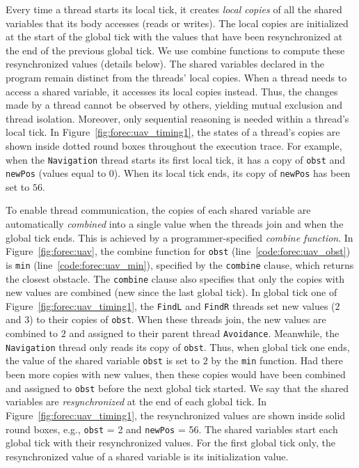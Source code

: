 Every time a thread starts its local tick, it creates
\emph{local copies} of all the shared variables that its
body accesses (reads or writes). 
The local copies are initialized at the start of the global tick with
the values that have been resynchronized at the end of the previous
global tick. We use combine functions to compute these resynchronized
values (details below). The shared variables
declared in the program remain distinct from the threads'
local copies. When a thread needs to access a shared
variable, it accesses its local copies instead. Thus, the
changes made by a thread cannot be observed by others,
yielding mutual exclusion and thread isolation. Moreover,
only sequential reasoning is needed within a thread's local
tick. In Figure~\ref{fig:forec:uav_timing1}, the states of a
thread's copies are shown inside dotted round boxes
throughout the execution trace. For example, when the
\verb$Navigation$ thread starts its first local tick, it has
a copy of \verb$obst$ and \verb$newPos$ (values equal to
$0$). When its local tick ends, its copy of \verb$newPos$ 
has been set to $56$.

To enable thread communication, the copies of each shared
variable are automatically \emph{combined} into a single value when the
threads join and when the global tick ends. This is achieved
by a programmer-specified \emph{combine function}. In
Figure~\ref{fig:forec:uav}, the combine function for 
\verb$obst$ (line~\ref{code:forec:uav_obst}) is \verb$min$
(line~\ref{code:forec:uav_min}), specified by the
\verb$combine$ clause, which returns the closest obstacle.
The \verb$combine$ clause also specifies that only the
copies with new values are combined (new since the last global
tick). In global tick one of
Figure~\ref{fig:forec:uav_timing1}, the \verb$FindL$ and
\verb$FindR$ threads set new values ($2$ and $3$) to their
copies of \verb$obst$. When these threads join, the new
values are combined to $2$ and assigned to their parent
thread \verb$Avoidance$. Meanwhile, the \verb$Navigation$
thread only reads its copy of \verb$obst$. Thus, when global
tick one ends, the value of the shared variable \verb$obst$
is set to $2$ by the \texttt{min} function. 
Had there been more copies with new values,
then these copies would have been combined and assigned to
\verb$obst$ before the next global tick started. We say that
the shared variables are \emph{resynchronized} at the end of
each global tick. In Figure~\ref{fig:forec:uav_timing1}, the
resynchronized values are shown inside solid round boxes,
e.g., \texttt{obst} = 2 and \texttt{newPos} = 56. The shared variables start each 
global tick with their resynchronized values. 
For the first global tick only, the resynchronized value of a shared 
variable is its initialization value. 

